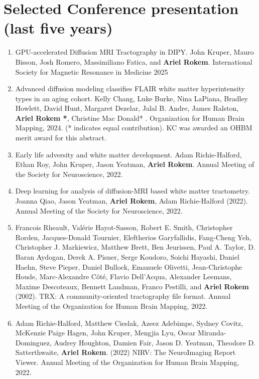 \documentclass[11pt,fullpage]{article}
\begin{document}
\section*{Selected Conference presentation (last five years)}
\begin{enumerate}

\item GPU-accelerated Diffusion MRI Tractography in DIPY. John Kruper, Mauro Bisson, Josh Romero, Massimiliano Fatica, and {\bf Ariel Rokem}. International Society for Magnetic Resonance in Medicine 2025


\item Advanced diffusion modeling classifies FLAIR white matter hyperintensity types in an aging cohort. Kelly Chang, Luke Burke, Nina LaPiana, Bradley Howlett, David Hunt, Margaret
Dezelar, Jalal B. Andre, James Ralston, {\bf Ariel Rokem *}, Christine Mac Donald* . Organization for Human Brain Mapping, 2024. (* indicates equal contribution). KC was awarded an OHBM merit award for this abstract.

\item Early life adversity and white matter development. Adam Richie-Halford, Ethan Roy, John Kruper, Jason Yeatman, {\bf Ariel Rokem}. Annual Meeting of the Society for Neuroscience, 2022.

\item Deep learning for analysis of diffusion-MRI based white matter tractometry. Joanna Qiao, Jason Yeatman, {\bf Ariel Rokem}, Adam Richie-Halford (2022). Annual Meeting of the Society for Neuroscience, 2022.

\item Francois Rheault, Val\'{e}rie Hayot-Sasson, Robert E. Smith, Christopher Rorden, Jacques-Donald Tournier, Eleftherios Garyfallidis, Fang-Cheng Yeh, Christopher J. Markiewicz, Matthew Brett, Ben Jeurissen, Paul A. Taylor, D. Baran Aydogan, Derek A. Pisner, Serge Koudoro, Soichi Hayashi, Daniel Haehn, Steve Pieper, Daniel Bullock, Emanuele Olivetti, Jean-Christophe Houde, Marc-Alexandre C\^{o}t\'{e}, Flavio Dell’Acqua, Alexander Leemans, Maxime Descoteaux, Bennett Landman, Franco Pestilli, and {\bf Ariel Rokem} (2002). TRX: A community-oriented tractography file format. Annual Meeting of the Organization for Human Brain Mapping, 2022.

\item Adam Richie-Halford, Matthew Cieslak, Azeez Adebimpe, Sydney Covitz, McKenzie Paige Hagen, John Kruper, Mengjia Lyu, Oscar Miranda-Dominguez, Audrey Houghton, Damien Fair, Jason D. Yeatman, Theodore D. Satterthwaite, {\bf Ariel Rokem}. (2022) NIRV: The NeuroImaging Report Viewer. Annual Meeting of the Organization for Human Brain Mapping, 2022.


\end{enumerate}
\end{document}
